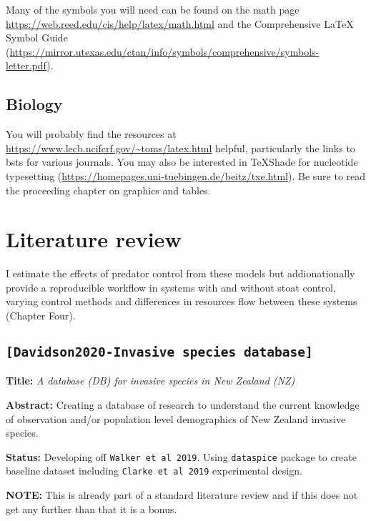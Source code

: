 Many of the symbols you will need can be found on the math page \url{https://web.reed.edu/cis/help/latex/math.html} and the Comprehensive LaTeX Symbol Guide (\url{https://mirror.utexas.edu/ctan/info/symbols/comprehensive/symbols-letter.pdf}).

\hypertarget{biology}{%
\section{Biology}\label{biology}}

You will probably find the resources at \url{https://www.lecb.ncifcrf.gov/~toms/latex.html} helpful, particularly the links to bsts for various journals. You may also be interested in TeXShade for nucleotide typesetting (\url{https://homepages.uni-tuebingen.de/beitz/txe.html}). Be sure to read the proceeding chapter on graphics and tables.

\hypertarget{lits}{%
\chapter{Literature review}\label{lits}}

I estimate the effects of predator control from these models but addionationally provide a reproducible workflow in systems with and without stoat control, varying control methods and differences in resources flow between these systems (Chapter Four).

\hypertarget{davidson2020-invasive-species-database}{%
\section{\texorpdfstring{\texttt{{[}Davidson2020-Invasive\ species\ database{]}}}{{[}Davidson2020-Invasive species database{]}}}\label{davidson2020-invasive-species-database}}

\textbf{Title:} \emph{A database (DB) for invasive species in New Zealand (NZ)}

\textbf{Abstract:} Creating a database of research to understand the current knowledge of observation and/or population level demographics of New Zealand invasive species.

\textbf{Status:} Developing off \texttt{Walker\ et\ al\ 2019}. Using \texttt{dataspice} package to create baseline dataset including \texttt{Clarke\ et\ al\ 2019} experimental design.

\textbf{NOTE:} This is already part of a standard literature review and if this does not get any further than that it is a bonus.

